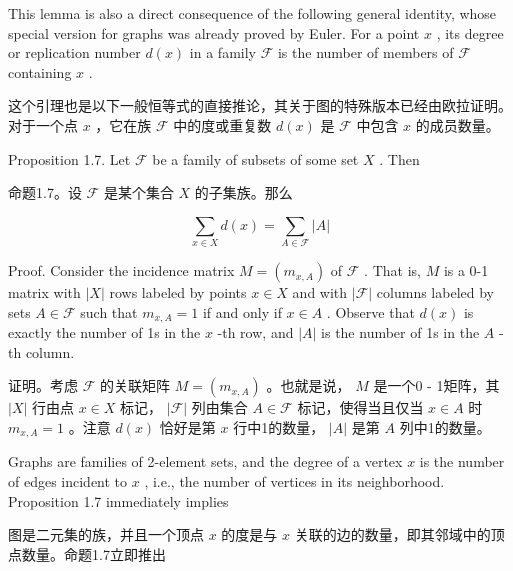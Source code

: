 \documentclass[10pt]{article}
\begin{document}
This lemma is also a direct consequence of the following general identity, whose special version for graphs was already proved by Euler. For a point \(x\) , its degree or replication number \(d\left( x\right)\) in a family \(\mathcal{F}\) is the number of members of \(\mathcal{F}\) containing \(x\) .

\begin{tcolorbox}\relax
这个引理也是以下一般恒等式的直接推论，其关于图的特殊版本已经由欧拉证明。对于一个点 \(x\) ，它在族 \(\mathcal{F}\) 中的度或重复数 \(d\left( x\right)\) 是 \(\mathcal{F}\) 中包含 \(x\) 的成员数量。
\end{tcolorbox}

Proposition 1.7. Let \(\mathcal{F}\) be a family of subsets of some set \(X\) . Then

\begin{tcolorbox}\relax
命题1.7。设 \(\mathcal{F}\) 是某个集合 \(X\) 的子集族。那么
\end{tcolorbox}

\[
\mathop{\sum }\limits_{{x \in  X}}d\left( x\right)  = \mathop{\sum }\limits_{{A \in  \mathcal{F}}}\left| A\right| \tag{1.10}
\]

Proof. Consider the incidence matrix \(M = \left( {m}_{x,A}\right)\) of \(\mathcal{F}\) . That is, \(M\) is a 0-1 matrix with \(\left| X\right|\) rows labeled by points \(x \in  X\) and with \(\left| \mathcal{F}\right|\) columns labeled by sets \(A \in  \mathcal{F}\) such that \({m}_{x,A} = 1\) if and only if \(x \in  A\) . Observe that \(d\left( x\right)\) is exactly the number of 1s in the \(x\) -th row, and \(\left| A\right|\) is the number of 1s in the \(A\) -th column.

\begin{tcolorbox}\relax
证明。考虑 \(\mathcal{F}\) 的关联矩阵 \(M = \left( {m}_{x,A}\right)\) 。也就是说， \(M\) 是一个0 - 1矩阵，其 \(\left| X\right|\) 行由点 \(x \in  X\) 标记， \(\left| \mathcal{F}\right|\) 列由集合 \(A \in  \mathcal{F}\) 标记，使得当且仅当 \(x \in  A\) 时 \({m}_{x,A} = 1\) 。注意 \(d\left( x\right)\) 恰好是第 \(x\) 行中1的数量， \(\left| A\right|\) 是第 \(A\) 列中1的数量。
\end{tcolorbox}

Graphs are families of 2-element sets, and the degree of a vertex \(x\) is the number of edges incident to \(x\) , i.e., the number of vertices in its neighborhood. Proposition 1.7 immediately implies

\begin{tcolorbox}\relax
图是二元集的族，并且一个顶点 \(x\) 的度是与 \(x\) 关联的边的数量，即其邻域中的顶点数量。命题1.7立即推出
\end{tcolorbox}
\end{document}
